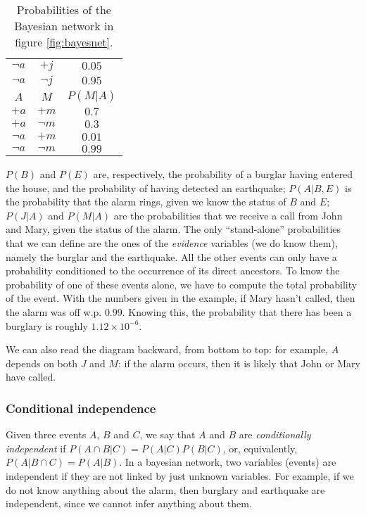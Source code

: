 \begin{table}[h]
\begin{minipage}{.35\linewidth}
\begin{tabular}{ccc}
          $\neg a$ & $+j$     & $0.05$ \\
          $\neg a$ & $\neg j$ & $0.95$ \\
          \bottomrule
          \toprule
          $A$ & $M$ & $P(M|A)$ \\
          \midrule
          $+a$     & $+m$     & $0.7$ \\
          $+a$     & $\neg m$ & $0.3$ \\
          $\neg a$ & $+m$     & $0.01$ \\
          $\neg a$ & $\neg m$ & $0.99$ \\
          \bottomrule
        \end{tabular}
    \end{minipage}%
    \caption{Probabilities of the Bayesian network in figure \ref{fig:bayesnet}.}
    \label{tab:probsbn}
\end{table}

$P(B)$ and $P(E)$ are, respectively, the probability of a burglar having entered the house, and the probability of having detected an earthquake; $P(A|B,E)$ is the probability that the alarm rings, given we know the status of $B$ and $E$; $P(J|A)$ and $P(M|A)$ are the probabilities that we receive a call from John and Mary, given the status of the alarm. The only ``stand-alone'' probabilities that we can define are the ones of the \textit{evidence} variables (we do know them), namely the burglar and the earthquake. All the other events can only have a probability conditioned to the occurrence of its direct ancestors. To know the probability of one of these events alone, we have to compute the total probability of the event.
With the numbers given in the example, if Mary hasn't called, then the alarm was off w.p. $0.99$. Knowing this, the probability that there has been a burglary is roughly $1.12 \times 10^{-6}$.

We can also read the diagram backward, from bottom to top: for example, $A$ depends on both $J$ and $M$: if the alarm occurs, then it is likely that John or Mary have called.

\subsubsection{Conditional independence}
Given three events $A$, $B$ and $C$, we say that $A$ and $B$ are \textit{conditionally independent} if $P(A \cap B | C) = P(A|C)P(B|C)$, or, equivalently, $P(A | B \cap C) = P(A|B)$. In a bayesian network, two variables (events) are independent if they are not linked by just unknown variables. For example, if we do not know anything about the alarm, then burglary and earthquake are independent, since we cannot infer anything about them.

